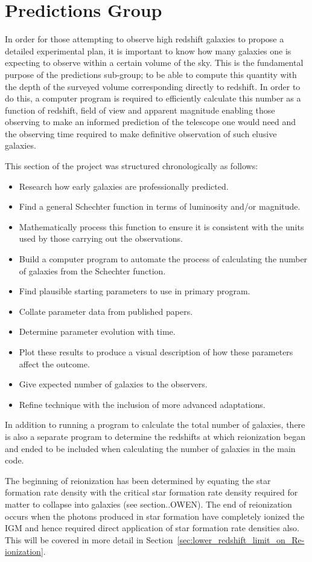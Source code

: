 
\section{Predictions Group} %
\label{sec:predictions_group}
	In order for those attempting to observe high redshift galaxies to propose a detailed experimental plan, it is important to know how many galaxies one is expecting to observe within a certain volume of the sky. This is the fundamental purpose of the predictions sub-group; to be able to compute this quantity with the depth of the surveyed volume corresponding directly to redshift. In order to do this, a computer program is required to efficiently calculate this number as a function of redshift, field of view and apparent magnitude enabling those observing to make an informed prediction of the telescope one would need and the observing time required to make definitive observation of such elusive galaxies.

	This section of the project was structured chronologically as follows:
	\begin{itemize}
		\item Research how early galaxies are professionally predicted.
		\item Find a general Schechter function in terms of luminosity and/or magnitude.
		\item Mathematically process this function to ensure it is consistent with the units used by those carrying out the observations.
		\item Build a computer program to automate the process of calculating the number of galaxies from the Schechter function.
		\item Find plausible starting parameters to use in primary program.
		\item Collate parameter data from published papers.
		\item Determine parameter evolution with time.
		\item Plot these results to produce a visual description of how these parameters affect the outcome.
		\item Give expected number of galaxies to the observers.
		\item Refine technique with the inclusion of more advanced adaptations.
	\end{itemize}

	In addition to running a program to calculate the total number of galaxies, there is also a separate program to determine the redshifts at which reionization began and ended to be included when calculating the number of galaxies in the main code.

	The beginning of reionization has been determined by equating the star formation rate density with the critical star formation rate density required for matter to collapse into galaxies (see section..OWEN). The end of reionization occurs when the photons produced in star formation have completely ionized the IGM and hence required direct application of star formation rate densities also. This will be covered in more detail in Section~\ref{sec:lower_redshift_limit_on_Re-ionization}.

